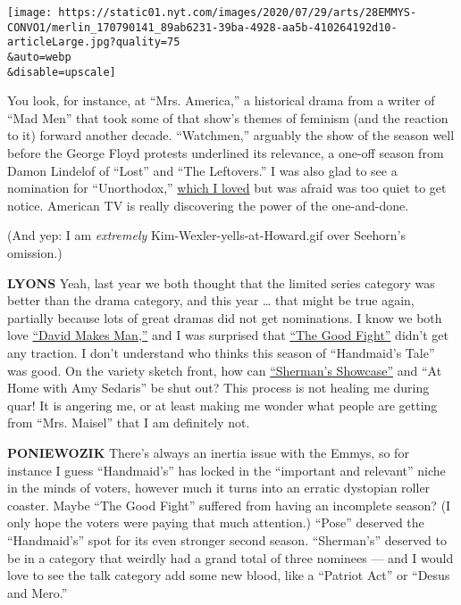\texttt{[image: https://static01.nyt.com/images/2020/07/29/arts/28EMMYS-CONVO1/merlin\_170790141\_89ab6231-39ba-4928-aa5b-410264192d10-articleLarge.jpg?quality=75\\\&auto=webp\\\&disable=upscale]}

You look, for instance, at ``Mrs. America,'' a historical drama from a
writer of ``Mad Men'' that took some of that show's themes of feminism
(and the reaction to it) forward another decade. ``Watchmen,'' arguably
the show of the season well before the George Floyd protests underlined
its relevance, a one-off season from Damon Lindelof of ``Lost'' and
``The Leftovers.'' I was also glad to see a nomination for
``Unorthodox,''
\href{https://www.nytimes.com/2020/03/25/arts/television/unorthodox-review-netflix.html}{which
I loved} but was afraid was too quiet to get notice. American TV is
really discovering the power of the one-and-done.

(And yep: I am \emph{extremely} Kim-Wexler-yells-at-Howard.gif over
Seehorn's omission.)

\textbf{LYONS} Yeah, last year we both thought that the limited series
category was better than the drama category, and this year \ldots{} that
might be true again, partially because lots of great dramas did not get
nominations. I know we both love
\href{https://www.nytimes.com/2020/07/23/arts/television/david-makes-man-hbo-max.html}{``David
Makes Man,''} and I was surprised that
\href{https://www.nytimes.com/2020/04/09/arts/television/the-good-fight-premiere.html}{``The
Good Fight''} didn't get any traction. I don't understand who thinks
this season of ``Handmaid's Tale'' was good. On the variety sketch
front, how can
\href{https://www.nytimes.com/2019/07/23/arts/television/south-side-shermans-showcase-review.html}{``Sherman's
Showcase''} and ``At Home with Amy Sedaris'' be shut out? This process
is not healing me during quar! It is angering me, or at least making me
wonder what people are getting from ``Mrs. Maisel'' that I am definitely
not.

\textbf{PONIEWOZIK} There's always an inertia issue with the Emmys, so
for instance I guess ``Handmaid's'' has locked in the ``important and
relevant'' niche in the minds of voters, however much it turns into an
erratic dystopian roller coaster. Maybe ``The Good Fight'' suffered from
having an incomplete season? (I only hope the voters were paying that
much attention.) ``Pose'' deserved the ``Handmaid's'' spot for its even
stronger second season. ``Sherman's'' deserved to be in a category that
weirdly had a grand total of three nominees --- and I would love to see
the talk category add some new blood, like a ``Patriot Act'' or ``Desus
and Mero.''

